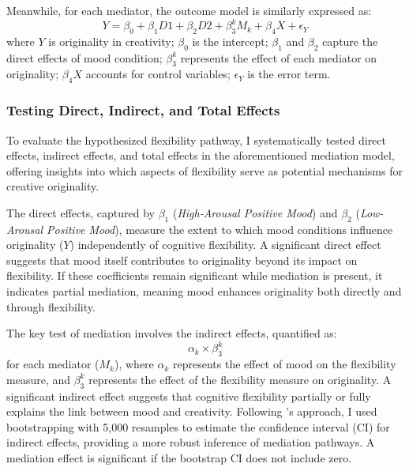 \documentclass[../MA_Thesis.tex]{subfiles}
\begin{document}
Meanwhile, for each mediator, the outcome model is similarly expressed as:
\begin{equation*}
    Y = \beta_0 + \beta_1 D1 + \beta_2 D2 + \beta_3^k M_k + \beta_4 X + \epsilon_Y
\end{equation*}
where \( Y \) is originality in creativity; \( \beta_0 \) is the intercept; \( \beta_1 \) and \( \beta_2 \) capture the direct effects of mood condition; \( \beta_3^k \) represents the effect of each mediator on originality; \( \beta_4 X \) accounts for control variables; \( \epsilon_Y \) is the error term.

\subsubsection*{Testing Direct, Indirect, and Total Effects}
To evaluate the hypothesized flexibility pathway, I systematically tested direct effects, indirect effects, and total effects in the aforementioned mediation model, offering insights into which aspects of flexibility serve as potential mechanisms for creative originality.

The direct effects, captured by \( \beta_1 \) (\textit{High-Arousal Positive Mood}) and \( \beta_2 \) (\textit{Low-Arousal Positive Mood}), measure the extent to which mood conditions influence originality (\(Y\)) independently of cognitive flexibility. A significant direct effect suggests that mood itself contributes to originality beyond its impact on flexibility. If these coefficients remain significant while mediation is present, it indicates partial mediation, meaning mood enhances originality both directly and through flexibility.

The key test of mediation involves the indirect effects, quantified as:
\begin{equation*}
    \alpha_k \times \beta_3^k
\end{equation*}
for each mediator (\(M_k\)), where \( \alpha_k \) represents the effect of mood on the flexibility measure, and \( \beta_3^k \) represents the effect of the flexibility measure on originality. A significant indirect effect suggests that cognitive flexibility partially or fully explains the link between mood and creativity. Following \textcite{preacher_asymptotic_2008}'s approach, I used bootstrapping with 5,000 resamples to estimate the confidence interval (CI) for indirect effects, providing a more robust inference of mediation pathways. A mediation effect is significant if the bootstrap CI does not include zero.
\end{document}

